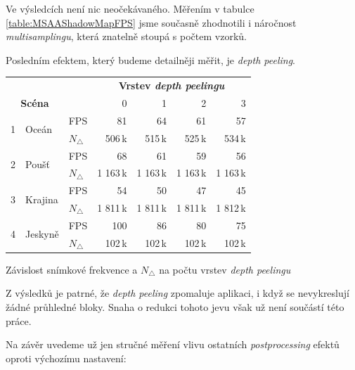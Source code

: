 Ve výsledcích není nic neočekávaného. Měřením v tabulce \ref{table:MSAAShadowMapFPS} jsme současně zhodnotili i náročnost \textit{multisamplingu}, která znatelně stoupá s počtem vzorků.

Posledním efektem, který budeme detailněji měřit, je \textit{depth peeling}. \nopagebreak
\begin{tableFloat}[H]
	\centering
	\def\arraystretch{1.1}
	\begin{tabular}{r l l || r r r r}
		&&& \multicolumn{4}{c}{\textbf{Vrstev \textit{depth peelingu}}} \\
		\multicolumn{2}{c}{\textbf{Scéna}} & & 0 & 1 & 2 & 3 \\ \hline \hline
		\multirow{2}{*}{1} & \multirow{2}{*}{Oceán} & FPS & 81 & 64 & 61 & 57 \\
		&& $N_\triangle$ & 506\,k & 515\,k & 525\,k & 534\,k \\ \hline
		
		\multirow{2}{*}{2} & \multirow{2}{*}{Poušť} & FPS & 68 & 61 & 59 & 56 \\
		&& $N_\triangle$ & 1 163\,k & 1 163\,k & 1 163\,k & 1 163\,k \\ \hline
		
		\multirow{2}{*}{3} & \multirow{2}{*}{Krajina} & FPS & 54 & 50 & 47 & 45 \\
		&& $N_\triangle$ & 1 811\,k & 1 811\,k & 1 811\,k & 1 812\,k \\ \hline
		
		\multirow{2}{*}{4} & \multirow{2}{*}{Jeskyně} & FPS & 100 & 86 & 80 & 75 \\
		&& $N_\triangle$ & 102\,k & 102\,k & 102\,k & 102\,k
	\end{tabular}
	\caption{Závislost snímkové frekvence a $N_\triangle$ na počtu vrstev \textit{depth peelingu}}
\end{tableFloat}

Z výsledků je patrné, že \textit{depth peeling} zpomaluje aplikaci, i když se nevykreslují žádné průhledné bloky. Snaha o redukci tohoto jevu však už není součástí této práce.

Na závěr uvedeme už jen stručné měření vlivu ostatních \textit{postprocessing} efektů oproti výchozímu nastavení:

